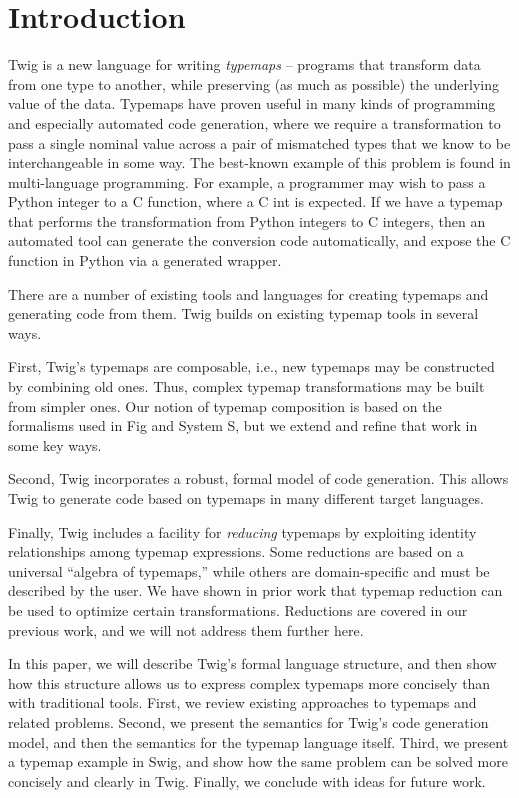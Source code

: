 
\section{Introduction}

Twig is a new language for writing \emph{typemaps} -- programs that transform data from one type to another, while preserving (as much as possible) the underlying value of the data. Typemaps have proven useful in many kinds of programming and especially automated code generation, where we require a transformation to pass a single nominal value across a pair of mismatched types that we know to be interchangeable in some way. The best-known example of this problem is found in multi-language programming. For example, a programmer may wish to pass a Python integer to a C function, where a C int is expected. If we have a typemap that performs the transformation from Python integers to C integers, then an automated tool can generate the conversion code automatically, and expose the C function in Python via a generated wrapper.

There are a number of existing tools and languages for creating typemaps and generating code from them. Twig builds on existing typemap tools in several ways.

First, Twig's typemaps are composable, i.e., new typemaps may be constructed by combining old ones. Thus, complex typemap transformations may be built from simpler ones. Our notion of typemap composition is based on the formalisms used in Fig\cite{fig} and System S\cite{system-s}, but we extend and refine that work in some key ways.

Second, Twig incorporates a robust, formal model of code generation. This allows Twig to generate code based on typemaps in many different target languages.

Finally, Twig includes a facility for \emph{reducing} typemaps by exploiting identity relationships among typemap expressions. Some reductions are based on a universal ``algebra of typemaps,'' while others are domain-specific and must be described by the user. We have shown in prior work that typemap reduction can be used to optimize certain transformations. Reductions are covered in our previous work, and we will not address them further here.

In this paper, we will describe Twig's formal language structure, and then show how this structure allows us to express complex typemaps more concisely than with traditional tools. First, we review existing approaches to typemaps and related problems. Second, we present the semantics for Twig's code generation model, and then the semantics for the typemap language itself. Third, we present a typemap example in Swig, and show how the same problem can be solved more concisely and clearly in Twig. Finally, we conclude with ideas for future work.
